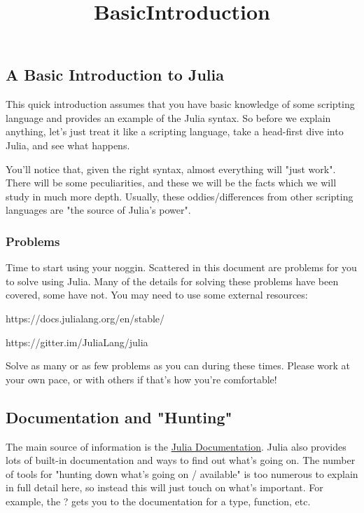 \documentclass[11pt]{article}
\title{BasicIntroduction}
\begin{document}
    
    
    \maketitle
    
    

    
    \subsection{A Basic Introduction to
Julia}\label{a-basic-introduction-to-julia}

This quick introduction assumes that you have basic knowledge of some
scripting language and provides an example of the Julia syntax. So
before we explain anything, let's just treat it like a scripting
language, take a head-first dive into Julia, and see what happens.

You'll notice that, given the right syntax, almost everything will "just
work". There will be some peculiarities, and these we will be the facts
which we will study in much more depth. Usually, these
oddies/differences from other scripting languages are "the source of
Julia's power".

    \subsubsection{Problems}\label{problems}

Time to start using your noggin. Scattered in this document are problems
for you to solve using Julia. Many of the details for solving these
problems have been covered, some have not. You may need to use some
external resources:

https://docs.julialang.org/en/stable/

https://gitter.im/JuliaLang/julia

Solve as many or as few problems as you can during these times. Please
work at your own pace, or with others if that's how you're comfortable!

    \subsection{Documentation and
"Hunting"}\label{documentation-and-hunting}

The main source of information is the
\href{http://docs.julialang.org/en/latest/manual/}{Julia Documentation}.
Julia also provides lots of built-in documentation and ways to find out
what's going on. The number of tools for "hunting down what's going on /
available" is too numerous to explain in full detail here, so instead
this will just touch on what's important. For example, the ? gets you to
the documentation for a type, function, etc.
\end{document}
